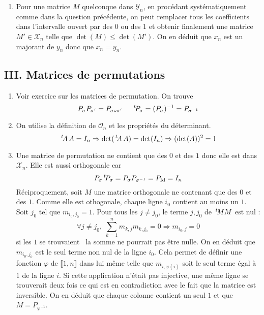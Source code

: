 \begin{enumerate}
\begin{enumerate}
  \item Pour une matrice $M$ quelconque dans $\mathcal{Y}_n$, en procédant systématiquement comme dans la question précédente, on peut remplacer tous les coefficients dans l'intervalle ouvert par des $0$ ou des $1$ et obtenir finalement une matrice $M'\in \mathcal{X}_n$ telle que $\det(M)\leq \det(M')$. On en déduit que $x_n$ est un majorant de $y_n$ donc que $x_n=y_n$. 
\end{enumerate}
\end{enumerate}

\subsection*{III. Matrices de permutations}
\begin{enumerate}
  \item Voir exercice sur les matrices de permutation. On trouve
\begin{displaymath}
  P_\sigma P_{\sigma'} = P_{\sigma \circ \sigma'} \hspace{0.5cm} \,\mathstrut^t\! P_\sigma = (P_\sigma)^{-1}= P_{\sigma^{-1}}
\end{displaymath}

  \item On utilise la définition de $\mathcal{O}_n$ et les propriétés du déterminant.
\begin{displaymath}
\,\mathstrut^t\! A \, A = I_n \Rightarrow \det(\,\mathstrut^t\! A \, A ) = \det(I_n)\Rightarrow (\det(A))^2 = 1  
\end{displaymath}

  \item Une matrice de permutation ne contient que des $0$ et des $1$ donc elle est dans $\mathcal{X}_n$. Elle est aussi orthogonale car 
\begin{displaymath}
  P_{\sigma} \,\mathstrut^t\! P_{\sigma} = P_{\sigma} P_{\sigma^{-1}}= P_{\operatorname{Id}} = I_n
\end{displaymath}
Réciproquement, soit $M$ une matrice orthogonale ne contenant que des $0$ et des $1$. Comme elle est othogonale, chaque ligne $i_0$ contient au moins un $1$. Soit $j_0$ tel que $m_{i_0,j_0}=1$.\newline
Pour tous les $j\neq j_0$, le terme $j, j_0$ de $\,\mathstrut^t\! M M$ est nul :
\begin{displaymath}
\forall j\neq j_0,\;  \sum _{k=1}^n m_{k,j}m_{k,j_0} = 0 \Rightarrow m_{i_0,j} = 0
\end{displaymath}
si les $1$ \og se trouvaient\fg~ la somme ne pourrait pas être nulle. On en déduit que $m_{i_0,j_0}$ est le seul terme non nul de la ligne $i_0$.\newline
Cela permet de définir une fonction $\varphi$ de $\llbracket 1,n \rrbracket$ dans lui même telle que $m_{i,\varphi(i)}$ soit le seul terme égal à $1$ de la ligne $i$. Si cette application n'était pas injective, une même ligne se trouverait deux fois ce qui est en contradiction avec le fait que la matrice est inversible. On en déduit que chaque colonne contient un seul $1$ et que $M=P_{\varphi^{-1}}$.


\end{enumerate}
